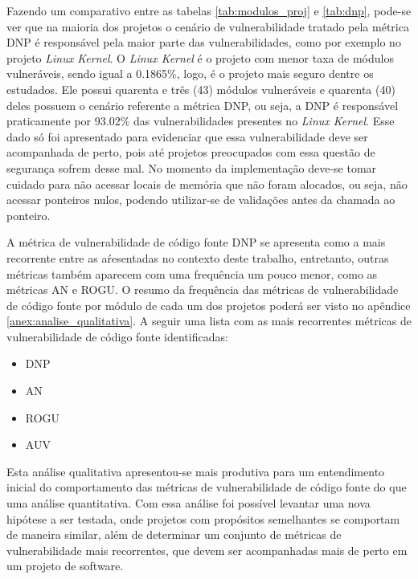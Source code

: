 Fazendo um comparativo entre as tabelas \ref{tab:modulos_proj} e \ref{tab:dnp}, pode-se ver que na
maioria dos projetos o cenário de vulnerabilidade tratado pela métrica DNP é responsável pela maior
parte das vulnerabilidades, como por exemplo no projeto \emph{Linux Kernel}. O \emph{Linux Kernel}
é o projeto com menor taxa de módulos vulneráveis, sendo igual a 0.1865\%, logo, é o projeto mais 
seguro dentre os estudados. Ele possui quarenta e três (43) módulos vulneráveis e quarenta (40) deles
possuem o cenário referente a métrica DNP, ou seja, a DNP é responsável praticamente por 93.02\% das 
vulnerabilidades presentes no \emph{Linux Kernel}. Esse dado só foi apresentado para evidenciar que
essa vulnerabilidade deve ser acompanhada de perto, pois até projetos preocupados com essa questão
de segurança sofrem desse mal. No momento da implementação deve-se tomar cuidado para não acessar 
locais de memória que não foram alocados, ou seja, não acessar ponteiros nulos,
podendo utilizar-se de validações antes da chamada ao ponteiro.

A métrica de vulnerabilidade de código fonte DNP se apresenta como a mais
recorrente entre as aŕesentadas
no contexto deste trabalho, entretanto, outras métricas também aparecem com uma frequência um pouco menor,
como as métricas AN e ROGU. O resumo da frequência das métricas de vulnerabilidade de código fonte por módulo
de cada um dos projetos poderá ser visto no apêndice \ref{anex:analise_qualitativa}. A seguir uma lista com
as mais recorrentes métricas de vulnerabilidade de código fonte identificadas:

\begin{multicols}{2}
\begin{itemize}
  \item DNP
  \item AN
  \item ROGU
  \item AUV
\end{itemize}
\end{multicols}

Esta análise qualitativa apresentou-se mais produtiva para um entendimento inicial do comportamento
das métricas de vulnerabilidade de código fonte do que uma análise quantitativa. Com essa análise foi
possível levantar uma nova hipótese a ser testada, onde projetos com propósitos
semelhantes se comportam de 
maneira similar, além de determinar um conjunto de métricas de vulnerabilidade mais recorrentes, que devem
ser acompanhadas mais de perto em um projeto de software.

